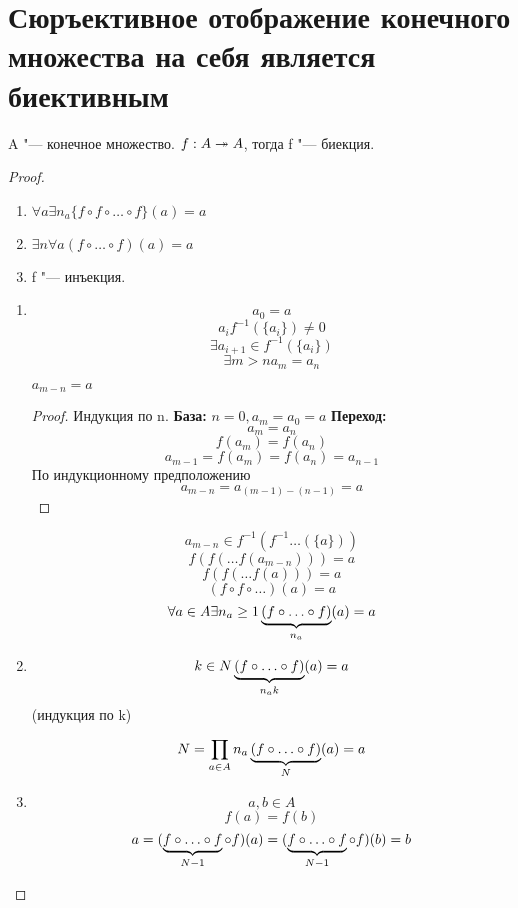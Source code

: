 ﻿\section{Сюръективное отображение конечного множества на себя является биективным}

\begin{theorem}{}
    A "--- конечное множество. 
    $f: A \twoheadrightarrow A$, тогда f "--- биекция.
\end{theorem}

\begin{proof}
    \begin{enumerate}
        \item $\forall a \exists n_a \{f \circ f \circ \ldots \circ f\}(a) = a$
        \item $\exists n \forall a (f \circ \ldots \circ f)(a)  = a$
        \item f "--- инъекция.
    \end{enumerate}
    \begin{enumerate}
    \item
    $$a_0 = a$$
    $$a_i f^{-1}(\{a_i\}) \ne 0$$
    $$\exists a_{i + 1} \in f^{-1}(\{a_i\})$$
    $$\exists m > n a_m = a_n$$
    \begin{lemma}{}
        $a_{m - n} = a$   
    \end{lemma}
    \begin{proof}
        Индукция по n.
        {\bf База:} $n = 0,  a_m = a_0 = a$
        {\bf Переход:} $$a_m = a_n$$
        $$f(a_m) = f(a_n)$$
        $$a_{m - 1} = f(a_m) = f(a_n) = a_{n - 1}$$
        По индукционному предположению 
        $$a_{m - n} = a_{(m - 1) - (n - 1)} = a$$
    \end{proof}
    $$a_{m - n} \in  f^{-1}(f^{-1}\ldots(\{a\}))$$
    $$f(f(\ldots f(a_{m - n}))) = a$$
    $$f(f(\ldots f(a))) = a$$
    $$(f \circ f \circ \ldots)(a) = a$$
    $$\forall a \in A \exists n_a \ge 1 \underbrace{(f \circ \ldots \circ f)}_{n_a}(a) = a$$
    \item 
    $$k \in N \underbrace{(f \circ \ldots \circ f)}_{n_a k}(a) = a$$
    (индукция по k)
    
    $$N = \prod_{a \in A} n_a  \underbrace{(f \circ \ldots \circ f)}_{N}(a) = a$$
    \item
    $$a, b \in A$$
    $$f(a) = f(b)$$
    $$a = (\underbrace{f \circ \ldots \circ f}_{N - 1} \circ f)(a) = (\underbrace{f \circ \ldots \circ f}_{N - 1} \circ f)(b) = b$$
    \end{enumerate}
\end{proof}